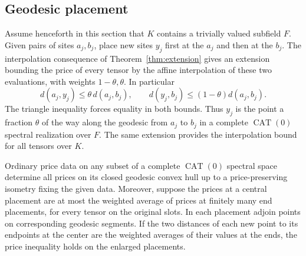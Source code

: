 \subsection{Geodesic placement}
Assume henceforth in this section that \(K\) contains a trivially valued
subfield \(F\). Given pairs of sites \(a_j,b_j\),
place new sites \(y_j\) first at the \(a_j\) and then at the \(b_j\).
The interpolation consequence of Theorem~\ref{thm:extension} gives an
extension bounding the price of every tensor by the affine interpolation
of these two evaluations, with weights \(1-\theta,\theta\). In particular
\[
 d(a_j,y_j)\le\theta\,d(a_j,b_j),\qquad
 d(y_j,b_j)\le(1-\theta)d(a_j,b_j).
\]
The triangle inequality forces equality in both bounds. Thus \(y_j\)
is the point a fraction \(\theta\) of the way along the geodesic from
\(a_j\) to \(b_j\) in a complete \(\operatorname{CAT}(0)\) spectral
realization over \(F\). The same extension provides the interpolation
bound for all tensors over \(K\).

\begin{lemma}\label{lem:geodesic}
Ordinary price data on any subset of a complete
\(\operatorname{CAT}(0)\) spectral space determine all prices on its
closed geodesic convex hull up to a price-preserving isometry fixing the
given data. Moreover, suppose the prices at a central placement are at
most the weighted average of prices at finitely many end placements, for
every tensor on the original slots. In each placement adjoin points
on corresponding geodesic segments. If the two distances of each new
point to its endpoints at the center are the weighted averages of their
values at the ends, the price inequality holds on the enlarged placements.
\end{lemma}

